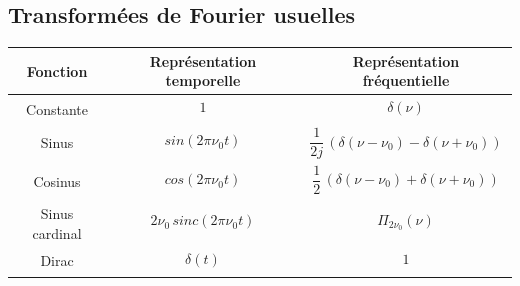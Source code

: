 \subsection*{Transformées de Fourier usuelles}
\bigskip
\begingroup
\setlength{\tabcolsep}{6pt} %
\renewcommand{\arraystretch}{2} %
\begin{center}
\begin{tabular}{|c|c|c|}
\hline
\textbf{Fonction} & \textbf{Représentation temporelle} & \textbf{Représentation fréquentielle} \\ 
\hline
\multirow{2}{*}{Constante} & $1$ & $\delta(\nu)$ \\
&  
& \\ 
\hline
\multirow{2}{*}{Sinus} & $sin(2\pi\nu_0t)$ & \multirow{2}{*}{$\dfrac{1}{2j}\,(\delta(\nu-\nu_0) - \delta(\nu+\nu_0))$} \\
&  
& \\
\hline
\multirow{2}{*}{Cosinus} & $cos(2\pi\nu_0t)$ & $\dfrac{1}{2}\,(\delta(\nu-\nu_0) + \delta(\nu+\nu_0))$ \\
&  
& \\
\hline
	\multirow{2}{*}{Sinus cardinal} & $2\nu_0\,sinc(2\pi \nu_0 t)$ & $\Pi_{2\nu_0}\left(\nu\right) $ \\[2ex]
&  
& \\
\hline
\multirow{2}{*}{Dirac} & $\delta(t)$ & $1$ \\
&  
& \\
\hline
\end{tabular}
\end{center}

\pagebreak

